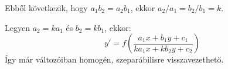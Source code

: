 \documentclass[main.tex]{subfiles}
\begin{document}
\begin{enumerate}
\begin{enumerate}
\begin{multicols}{2}
\begin{enumerate}
                          \vspace{.66em}
                          Ebből következik, hogy $a_1 b_2 = a_2 b_1$,
                          ekkor $a_2 / a_1 = b_2 / b_1 = k$.

                          Legyen $a_2 = k a_1$ és $b_2 = k b_1$,
                          ekkor:
                          \[
                            y' = f \left(
                            \frac{
                              a_1 x + b_1 y + c_1
                            }{
                              k a_1 x + k b_2 y + c_2
                            }
                            \right)
                          \]
                          Így már változóiban homogén,
                          szeparábilisre visszavezethető.
                  \end{enumerate}
                \end{multicols}
        \end{enumerate}
\end{enumerate}
\end{document}

